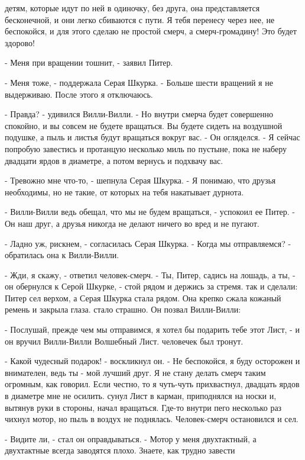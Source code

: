 детям, которые идут по ней в одиночку, без друга, она представляется 
бесконечной, и они легко сбиваются с пути. Я тебя перенесу через нее, 
не беспокойся, и для этого сделаю не простой смерч, а смерч-громадину! 
Это будет здорово!
\par- Меня при вращении тошнит, - заявил Питер.
\par- Меня тоже, - поддержала Серая Шкурка. - Больше шести вращений я 
не выдерживаю. После этого я отключаюсь.
\par- Правда? - удивился Вилли-Вилли. - Но внутри смерча будет 
совершенно спокойно, и вы совсем не будете вращаться. Вы будете сидеть 
на воздушной подушке, а пыль и листья будут вращаться вокруг вас. - Он 
огляделся. - Я сейчас попробую завестись и протанцую несколько миль по 
пустыне, пока не наберу двадцати ярдов в диаметре, а потом вернусь и 
подхвачу вас.
\par- Тревожно мне что-то, - шепнула Серая Шкурка. - Я понимаю, что 
друзья необходимы, но не такие, от которых на тебя накатывает дурнота.
\par- Вилли-Вилли ведь обещал, что мы не будем вращаться, - успокоил 
ее Питер. - Он наш друг, а друзья никогда не делают ничего во вред и 
не пугают.
\par- Ладно уж, рискнем, - согласилась Серая Шкурка. - Когда мы 
отправляемся? - обратилась она к Вилли-Вилли.
\par- Жди, я скажу, - ответил человек-смерч. - Ты, Питер, садись на 
лошадь, а ты, - он обернулся к Серой Шкурке, - стой рядом и держись за 
стремя.
 так и сделали: Питер сел верхом, а Серая Шкурка стала рядом. 
Она крепко сжала кожаный ремень и закрыла глаза.
 стало страшно. Он позвал Вилли-Вилли:
\par- Послушай, прежде чем мы отправимся, я хотел бы подарить тебе 
этот Лист, - и он вручил Вилли-Вилли Волшебный Лист.
 человечек был тронут.
\par- Какой чудесный подарок! - воскликнул он. - Не беспокойся, я буду 
осторожен и внимателен, ведь ты - мой лучший друг. Я не стану делать 
смерч таким огромным, как говорил. Если честно, то я чуть-чуть 
прихвастнул, двадцать ярдов в диаметре мне не осилить.
 сунул Лист в карман, приподнялся на носки и, вытянув руки в 
стороны, начал вращаться. Где-то внутри пего несколько раз чихнул 
мотор, но пыль в воздух не поднялась. Человек-смерч остановился и сел.
\par- Видите ли, - стал он оправдываться. - Мотор у меня двухтактный, 
а двухтактные всегда заводятся плохо. Знаете, как трудно завести 
